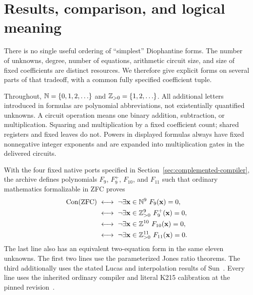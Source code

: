\section{Results, comparison, and logical meaning}
\label{sec:overview}

There is no single useful ordering of ``simplest'' Diophantine forms.
The number of unknowns, degree, number of equations, arithmetic circuit
size, and size of fixed coefficients are distinct resources. We therefore
give explicit forms on several parts of that tradeoff, with a common
fully specified coefficient tuple.

Throughout, $\mathbb N=\{0,1,2,\ldots\}$ and $\mathbb Z_{>0}=\{1,2,\ldots\}$.
All additional letters introduced in formulas are polynomial
abbreviations, not existentially quantified unknowns. A circuit operation
means one binary addition, subtraction, or multiplication. Squaring and
multiplication by a fixed coefficient count; shared registers and fixed
leaves do not. Powers in displayed formulas always have fixed
nonnegative integer exponents and are expanded into multiplication gates
in the delivered circuits.

\begin{theorem}
\label{thm:main}
With the four fixed native ports specified in
Section~\ref{sec:complemented-compiler}, the archive defines polynomials
$F_9$, $F_9^+$, $F_{10}$, and $F_{11}$ such that ordinary mathematics
formalizable in ZFC proves
\begin{align*}
 \Con(\mathrm{ZFC})
 &\ \longleftrightarrow\ \neg\exists\mathbf x\in\N^9\ F_9(\mathbf x)=0,\\
 &\ \longleftrightarrow\ \neg\exists\mathbf x\in\Zpos^9\ F_9^+(\mathbf x)=0,\\
 &\ \longleftrightarrow\ \neg\exists\mathbf x\in\Z^{10}\ F_{10}(\mathbf x)=0,\\
 &\ \longleftrightarrow\ \neg\exists\mathbf x\in\Zpos^{11}\ F_{11}(\mathbf x)=0.
\end{align*}
The last line also has an equivalent two-equation form in the same
eleven unknowns. The first two lines use the parameterized Jones ratio
theorems. The third additionally uses the stated Lucas and interpolation
results of Sun~\cite{sun2026}. Every line uses the inherited ordinary
compiler and literal K215 calibration at the pinned revision~\cite{repo}.
\end{theorem}

